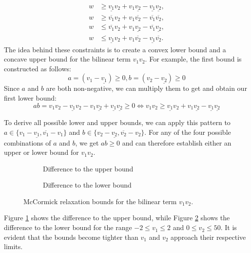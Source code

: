 \[
	\begin{aligned}
		w & \geq \underline{v_1} v_2 + v_1 \underline{v_2} - \underline{v_1} \underline{v_2}, \\
		w & \geq \overline{v_1} v_2 + v_1 \overline{v_2} - \overline{v_1} \overline{v_2},     \\
		w & \leq \overline{v_1} v_2 + v_1 \underline{v_2} - \overline{v_1} \underline{v_2},   \\
		w & \leq \underline{v_1} v_2 + v_1 \overline{v_2} - \underline{v_1} \overline{v_2}.
	\end{aligned}
\]
The idea behind these constraints is to create a convex lower bound and a concave upper bound for the bilinear term $v_1v_2$.
For example, the first bound is constructed as follows: \[ a = (v_1 - \underline{v_1}) \geq 0, b = (v_2 - \underline{v_2}) \geq 0 \] Since $a$ and
$b$ are both non-negative, we can multiply them to get and obtain our first lower bound: \[ ab = v_1v_2 - \underline{v_1}v_2 - v_1\underline{v_2} +
	\underline{v_1}\underline{v_2} \geq 0 \iff v_1v_2 \geq \underline{v_1}v_2 + v_1\underline{v_2} - \underline{v_1}\underline{v_2} \]

To derive all possible lower and upper bounds, we can apply this pattern to $a \in \{v_1 - \underline{v_1}, \overline{v_1} -
	v_1\}$ and $b \in \{v_2 - \underline{v_2}, \overline{v_2} - v_2\}$.
For any of the four possible combinations of $a$ and $b$, we get $ab \geq 0$ and can therefore establish either an upper or lower bound for $v_1v_2$.

\begin{figure}[h]
	\centering
	\begin{subfigure}[b]{0.45\textwidth}
		\centering
		\resizebox{\textwidth}{!}{}
		\caption{Difference to the upper bound}
		\label{fig:mccormick_0_upper}
	\end{subfigure}
	\hfill
	\begin{subfigure}[b]{0.45\textwidth}
		\centering
		\resizebox{\textwidth}{!}{}
		\caption{Difference to the lower bound}
		\label{fig:mccormick_0_lower}
	\end{subfigure}
	\caption{McCormick relaxation bounds for the bilinear term $ v_1v_2 $.}
	\label{fig:mccormick_bounds_0}
\end{figure}

Figure \ref{fig:mccormick_0_upper} shows the difference to the upper bound, while Figure \ref{fig:mccormick_0_lower} shows the difference to the
lower bound for the range $ -2 \leq v_1 \leq 2 $ and $ 0 \leq v_2 \leq 50 $.
It is evident that the bounds become tighter than $ v_1 $ and $ v_2 $ approach their respective limits.

